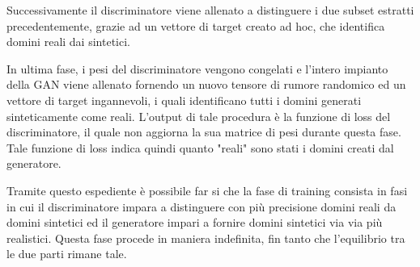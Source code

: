 Successivamente il discriminatore viene allenato a distinguere i due subset estratti precedentemente, grazie ad un vettore di target creato ad hoc, che identifica domini reali dai sintetici.

In ultima fase, i pesi del discriminatore vengono congelati e l'intero impianto della GAN viene allenato fornendo un nuovo tensore di rumore randomico ed un vettore di target ingannevoli, i quali identificano tutti i domini generati sinteticamente come reali. L'output di tale procedura è la funzione di loss del discriminatore, il quale non aggiorna la sua matrice di pesi durante questa fase. Tale funzione di loss indica quindi quanto "reali" sono stati i domini creati dal generatore.

Tramite questo espediente è possibile far si che la fase di training consista in fasi in cui il discriminatore impara a distinguere con più precisione domini reali da domini sintetici ed il generatore impari a fornire domini sintetici via via più realistici. Questa fase procede in maniera indefinita, fin tanto che l'equilibrio tra le due parti rimane tale.

